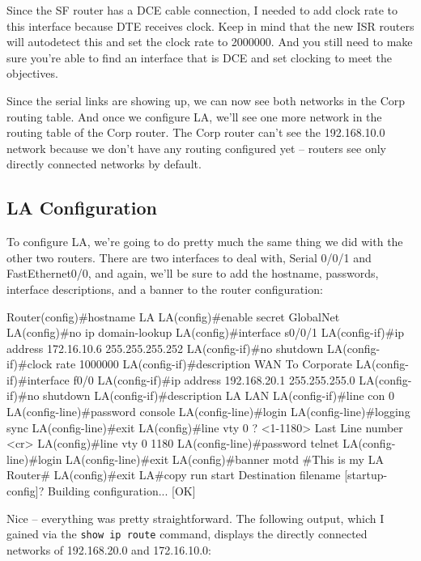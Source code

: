 Since the SF router has a DCE cable connection, I needed to add clock
rate to this interface because DTE receives clock. Keep in mind that the
new ISR routers will autodetect this and set the clock rate to 2000000.
And you still need to make sure you're able to find an interface that is
DCE and set clocking to meet the objectives.

Since the serial links are showing up, we can now see both networks in
the Corp routing table. And once we configure LA, we'll see one more
network in the routing table of the Corp router. The Corp router can't
see the 192.168.10.0 network because we don't have any routing
configured yet -- routers see only directly connected networks by
default.

\subsection[LA
Configuration]{\texorpdfstring{\protect\hypertarget{c09.xhtmlux5cux23c09-sec-8}{}{}LA
Configuration}{LA Configuration}}

To configure LA, we're going to do pretty much the same thing we did
with the other two routers. There are two interfaces to deal with,
Serial 0/0/1 and FastEthernet0/0, and again, we'll be sure to add the
hostname, passwords, interface descriptions, and a banner to the router
configuration:

\begin{cli}
Router(config)#hostname LA
LA(config)#enable secret GlobalNet
LA(config)#no ip domain-lookup
LA(config)#interface s0/0/1
LA(config-if)#ip address 172.16.10.6 255.255.255.252
LA(config-if)#no shutdown
LA(config-if)#clock rate 1000000
LA(config-if)#description WAN To Corporate
LA(config-if)#interface f0/0
LA(config-if)#ip address 192.168.20.1 255.255.255.0
LA(config-if)#no shutdown
LA(config-if)#description LA LAN
LA(config-if)#line con 0
LA(config-line)#password console
LA(config-line)#login
LA(config-line)#logging sync
LA(config-line)#exit
LA(config)#line vty 0 ?
  <1-1180>  Last Line number
  <cr>
LA(config)#line vty 0 1180
LA(config-line)#password telnet
LA(config-line)#login
LA(config-line)#exit
LA(config)#banner motd #This is my LA Router#
LA(config)#exit
LA#copy run start
Destination filename [startup-config]?
Building configuration...
[OK]
\end{cli}

Nice -- everything was pretty straightforward. The following output,
which I gained via the \texttt{show\ ip\ route} command, displays the
directly connected networks of 192.168.20.0 and 172.16.10.0:

